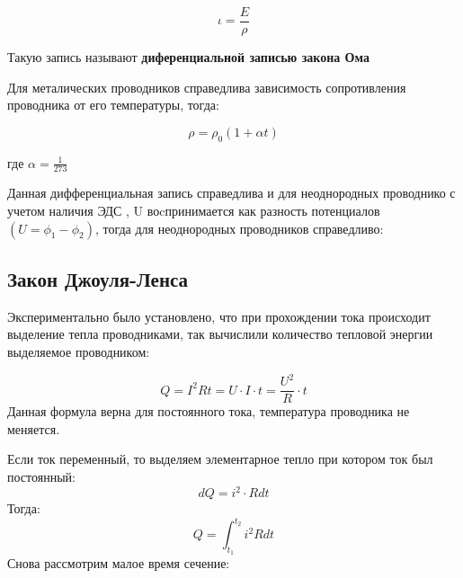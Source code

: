 \documentclass[../main.tex]{subfiles}
\begin{document}
\[\iota = \frac{E}{\rho}\]

 Такую запись называют \textbf{диференциальной записью закона Ома}

Для металических проводников справедлива  зависимость сопротивления проводника от его температуры, тогда:

\[\rho = \rho_0 (1 + \alpha t)\]
\begin{center}
    где $\alpha = \frac{1}{273}$
\end{center}

Данная дифференциальная запись справедлива и для неоднородных проводнико с учетом наличия ЭДС , U воcпринимается как разность потенциалов $(U = \phi_1 - \phi_2)$, тогда 
для неоднородных проводников справедливо:

\vspace{5px}



\subsection{Закон Джоуля-Ленса}
Экспериментально было установлено, что при прохождении тока происходит выделение тепла проводниками, так вычислили количество тепловой энергии выделяемое проводником:

\[ Q = I^2 R t = U \cdot I \cdot t = \frac{U^2}{R} \cdot t\]
Данная формула верна для постоянного тока, температура проводника не меняется.

\vspace{5px}

Если ток переменный, то выделяем элементарное тепло при котором ток был постоянный:
\[dQ = i^2 \cdot R dt\]
Тогда:
\[Q = \int_{t_1}^{t_2} i^2 R dt\]
Снова рассмотрим малое время сечение:
\end{document}
